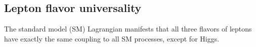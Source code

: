 \subsection{Lepton flavor universality}
The standard model (SM) Lagrangian manifests that all three flavors of leptons
have exactly the same coupling to all SM processes, except for Higgs.
